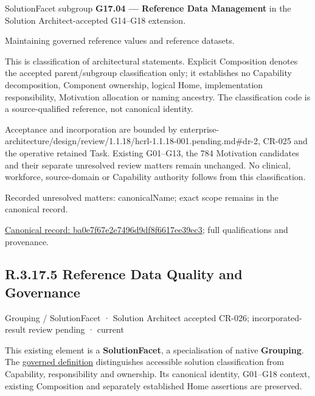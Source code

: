 SolutionFacet subgroup \textbf{G17.04 — Reference Data Management} in the Solution Architect-accepted G14–G18 extension.



Maintaining governed reference values and reference datasets.



This is classification of architectural statements. Explicit Composition denotes the accepted parent/subgroup classification only; it establishes no Capability decomposition, Component ownership, logical Home, implementation responsibility, Motivation allocation or naming ancestry. The classification code is a source-qualified reference, not canonical identity.



Acceptance and incorporation are bounded by enterprise-architecture/design/review/1.1.18/hcrl-1.1.18-001.pending.md\#dr-2, CR-025 and the operative retained Task. Existing G01–G13, the 784 Motivation candidates and their separate unresolved review matters remain unchanged. No clinical, workforce, source-domain or Capability authority follows from this classification.


{\small Recorded unresolved matters: canonicalName; exact scope remains in the canonical record.}\par
{\footnotesize \href{../../../../../../../continuum/grouping/ba0e7f67e2e7496d9df8f6617ee39ec3.md}{Canonical record: ba0e7f67e2e7496d9df8f6617ee39ec3}; full qualifications and provenance.}\par
\subsection*{R.3.17.5 Reference Data Quality and Governance}
\label{navigation:R.3.17.5}

\label{element:400c5c54a23a44588cc473ed10ead4a8}
{\small Grouping / SolutionFacet · Solution Architect accepted CR-026; incorporated-result review pending · current}\par

This existing element is a \textbf{SolutionFacet}, a specialisation of native
\textbf{Grouping}. The \href{\detokenize{../../../../../../../governance/continuum-representation.md#solutionfacet-classification--1119-candidate}}{governed definition}
distinguishes accessible solution classification from Capability, responsibility
and ownership. Its canonical identity, G01–G18 context, existing Composition
and separately established Home assertions are preserved.



